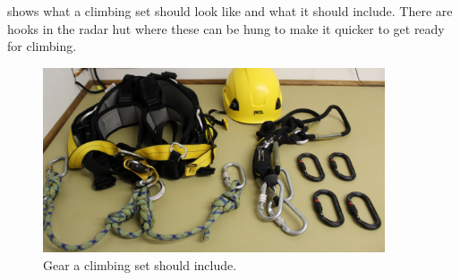 \par
{} shows what a climbing set should look like and what it should include. There are hooks in the radar hut where these can be hung to make it quicker to get ready for climbing.
\begin{figure}[H]
	\centering
	\includegraphics[width=0.9\textwidth]{images/infrastructure/set.jpg}
	\caption{Gear a climbing set should include.}
	\label{fig:infra_set}
\end{figure}

